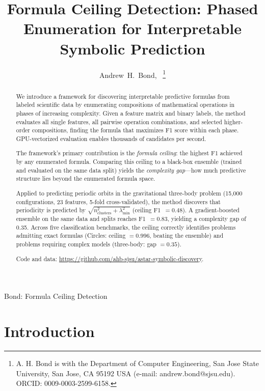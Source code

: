 \documentclass[journal]{IEEEtran}
\begin{document}
\title{Formula Ceiling Detection: Phased Enumeration for Interpretable Symbolic Prediction}

\author{Andrew~H.~Bond,~
\thanks{A. H. Bond is with the Department of Computer Engineering,
San Jose State University, San Jose, CA 95192 USA
(e-mail: andrew.bond@sjsu.edu). ORCID: 0009-0003-2599-6158.}
}

{Bond: Formula Ceiling Detection}

\maketitle

\begin{abstract}
We introduce a framework for discovering interpretable predictive
formulas from labeled scientific data by enumerating compositions of
mathematical operations in phases of increasing complexity. Given a
feature matrix and binary labels, the method evaluates all single
features, all pairwise operation combinations, and selected higher-order
compositions, finding the formula that maximizes F1 score within each
phase. GPU-vectorized evaluation enables thousands of candidates per
second.

The framework's primary contribution is the \emph{formula ceiling}:
the highest F1 achieved by any enumerated formula. Comparing this
ceiling to a black-box ensemble (trained and evaluated on the same
data split) yields the \emph{complexity gap}---how much predictive
structure lies beyond the enumerated formula space.

Applied to predicting periodic orbits in the gravitational three-body
problem (15{,}000 configurations, 23 features, 5-fold cross-validated),
the method discovers that periodicity is predicted by
$\sqrt{n_\mathrm{clusters}^2 + \lambda_\mathrm{min}^2}$
(ceiling F1~$= 0.48$). A gradient-boosted ensemble on the same data
and splits reaches F1~$= 0.83$, yielding a complexity gap of 0.35.
Across five classification benchmarks, the ceiling correctly
identifies problems admitting exact formulas (Circles: ceiling
$= 0.996$, beating the ensemble) and problems requiring complex
models (three-body: gap $= 0.35$).

Code and data: \url{https://github.com/ahb-sjsu/astar-symbolic-discovery}.
\end{abstract}

\section{Introduction}
\end{document}
